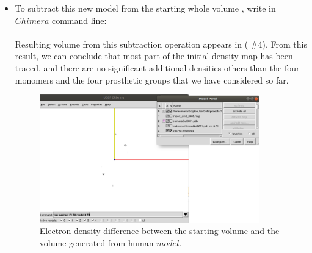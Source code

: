 \begin{itemize}
\begin{itemize}
  \item To subtract this new model from the starting whole volume , write in $Chimera$ command line:\\
  
   \\
  
  Resulting volume from this subtraction operation appears in  ( \#4). From this result, we can conclude that most part of the initial density map has been traced, and there are no significant additional densities others than the four monomers and the four prosthetic groups that we have considered so far.
  
  \begin{figure}[H]
    \centering 
    \captionsetup{width=.7\linewidth} 
    \includegraphics[width=0.90\textwidth]{Images/Fig44.png}
    \caption{Electron density difference between the starting volume  and the volume generated from human  $model$.}
    \label{fig:chimera_operate_vol_3}
   \end{figure}
  
  
  \end{itemize}
 
\end{itemize}
